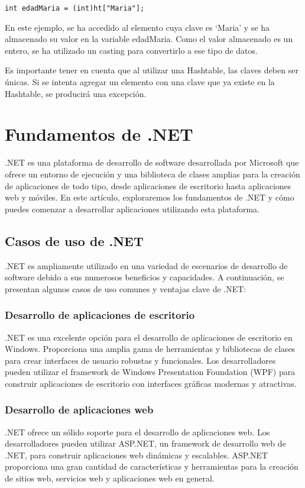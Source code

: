 \documentclass[executivepaper]{article}
\begin{document}
\begin{lstlisting}
int edadMaria = (int)ht["Maria"];
\end{lstlisting}

En este ejemplo, se ha accedido al elemento cuya clave es \enquote*{Maria} y se ha almacenado su valor en la variable edadMaria. Como el valor almacenado es un entero, se ha utilizado un casting para convertirlo a ese tipo de datos.

Es importante tener en cuenta que al utilizar una Hashtable, las claves deben ser únicas. Si se intenta agregar un elemento con una clave que ya existe en la Hashtable, se producirá una excepción.

\section{Fundamentos de .NET}
.NET es una plataforma de desarrollo de software desarrollada por Microsoft que ofrece un entorno de ejecución y una biblioteca de clases amplias para la creación de aplicaciones de todo tipo, desde aplicaciones de escritorio hasta aplicaciones web y móviles. En este artículo, exploraremos los fundamentos de .NET y cómo puedes comenzar a desarrollar aplicaciones utilizando esta plataforma.

\subsection*{Casos de uso de .NET}
.NET es ampliamente utilizado en una variedad de escenarios de desarrollo de software debido a sus numerosos beneficios y capacidades. A continuación, se presentan algunos casos de uso comunes y ventajas clave de .NET:

\subsubsection*{Desarrollo de aplicaciones de escritorio}
.NET es una excelente opción para el desarrollo de aplicaciones de escritorio en Windows. Proporciona una amplia gama de herramientas y bibliotecas de clases para crear interfaces de usuario robustas y funcionales. Los desarrolladores pueden utilizar el framework de Windows Presentation Foundation (WPF) para construir aplicaciones de escritorio con interfaces gráficas modernas y atractivas.

\subsubsection*{Desarrollo de aplicaciones web}
.NET ofrece un sólido soporte para el desarrollo de aplicaciones web. Los desarrolladores pueden utilizar ASP.NET, un framework de desarrollo web de .NET, para construir aplicaciones web dinámicas y escalables. ASP.NET proporciona una gran cantidad de características y herramientas para la creación de sitios web, servicios web y aplicaciones web en general.
\end{document}
